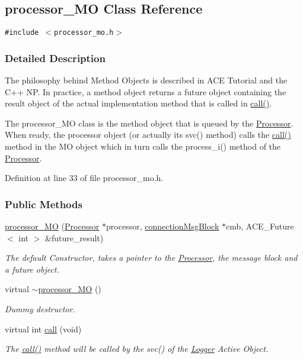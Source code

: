 \hypertarget{classprocessor__MO}{
\subsection{processor\_\-MO Class Reference}
\label{classprocessor__MO}
}
{\tt \#include $<$processor\_\-mo.h$>$}



\subsubsection{Detailed Description}
The philosophy behind Method Objects is described in ACE Tutorial and the C++ NP. In practice, a method object returns a future object containing the result object of the actual implementation method that is called in \hyperlink{classprocessor__MO_processor__MOa2}{call()}.

The processor\_\-MO class is the method object that is queued by the \hyperlink{classProcessor}{Processor}. When ready, the processor object (or actually its svc() method) calls the \hyperlink{classprocessor__MO_processor__MOa2}{call()} method in the MO object which in turn calls the process\_\-i() method of the \hyperlink{classProcessor}{Processor}. 



Definition at line 33 of file processor\_\-mo.h.\subsubsection*{Public Methods}
\begin{CompactItemize}
\item 
\hyperlink{classprocessor__MO_processor__MOa0}{processor\_\-MO} (\hyperlink{classProcessor}{Processor} $\ast$processor, \hyperlink{classconnectionMsgBlock}{connection\-Msg\-Block} $\ast$cmb, ACE\_\-Future$<$ int $>$ \&future\_\-result)
\begin{CompactList}\small\item\em The default Constructor, takes a pointer to the \hyperlink{classProcessor}{Processor}, the message block and a future object.\item\end{CompactList}\item 
virtual \hyperlink{classprocessor__MO_processor__MOa1}{$\sim$processor\_\-MO} ()
\begin{CompactList}\small\item\em Dummy destructor.\item\end{CompactList}\item 
virtual int \hyperlink{classprocessor__MO_processor__MOa2}{call} (void)
\begin{CompactList}\small\item\em The \hyperlink{classprocessor__MO_processor__MOa2}{call()} method will be called by the svc() of the \hyperlink{classLogger}{Logger} Active Object.\item\end{CompactList}\end{CompactItemize}
